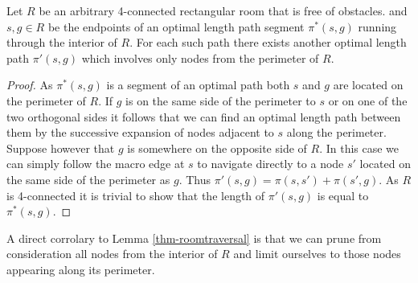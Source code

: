 \begin{lemma}
\label{thm-roomtraversal}
Let $R$ be an arbitrary 4-connected rectangular room that is free of obstacles.
and $s, g \in R$ be the endpoints of an optimal length path 
segment $\pi^*(s, g)$ running through the interior of $R$. 
For each such path there exists another optimal length path $\pi'(s, g)$ 
which involves only nodes from the perimeter of $R$. 
\end{lemma}
\begin{proof}
\par
As $\pi^*(s, g)$ is a segment of an optimal path both $s$ and $g$ are located on the perimeter of $R$.
If $g$ is on the same side of the perimeter to $s$ or on one of the two orthogonal sides 
it follows that we can find an optimal length path between them by the successive expansion of 
nodes adjacent to $s$ along the perimeter.
Suppose however that $g$ is somewhere on the opposite side of $R$.
In this case we can simply follow the macro edge at $s$ to navigate directly to a node $s'$ located on
the same side of the perimeter as $g$.
Thus $\pi'(s, g) = \pi(s, s') + \pi(s',g)$.
As $R$ is 4-connected it is trivial to show that the length of $\pi'(s, g)$ is equal to $\pi^*(s, g)$.
\end{proof}

A direct corrolary to Lemma \ref{thm-roomtraversal} is that we can prune from consideration
all nodes from the interior of $R$ and limit ourselves to those nodes appearing along its perimeter.
